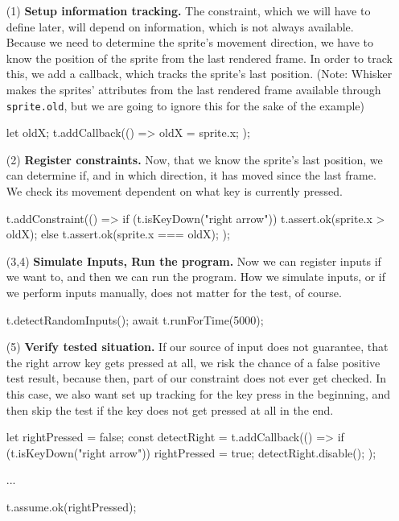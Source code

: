 \begin{enumerate}
    \item[(1)] \textbf{Setup information tracking.}
        The constraint, which we will have to define later, will depend on information, which is not always available.
        Because we need to determine the sprite's movement direction, we have to know the position of the sprite from the last rendered frame.
        In order to track this, we add a callback, which tracks the sprite's last position.
        (Note: Whisker makes the sprites' attributes from the last rendered frame available through \texttt{sprite.old}, but we are going to ignore this for the sake of the example)
        \begin{javascriptcode}
            let oldX;
            t.addCallback(() => {
                oldX = sprite.x;
            });
        \end{javascriptcode}
    \item[(2)] \textbf{Register constraints.}
        Now, that we know the sprite's last position, we can determine if, and in which direction, it has moved since the last frame.
        We check its movement dependent on what key is currently pressed.
        \begin{javascriptcode}
            t.addConstraint(() => {
                if (t.isKeyDown("right arrow")) {
                    t.assert.ok(sprite.x > oldX);
                } else {
                    t.assert.ok(sprite.x === oldX);
                }
            });
        \end{javascriptcode}
    \item[(3,4)] \textbf{Simulate Inputs, Run the program.}
        \setcounter{enumi}{4}
        Now we can register inputs if we want to, and then we can run the program.
        How we simulate inputs, or if we perform inputs manually, does not matter for the test, of course.
        \begin{javascriptcode}
            t.detectRandomInputs();
            await t.runForTime(5000);
        \end{javascriptcode}
    \item[(5)] \textbf{Verify tested situation.}
        If our source of input does not guarantee, that the right arrow key gets pressed at all, we risk the chance of a false positive test result,
        because then, part of our constraint does not ever get checked.
        In this case, we also want set up tracking for the key press in the beginning,
        and then skip the test if the key does not get pressed at all in the end.
        \begin{javascriptcode}
            let rightPressed = false;
            const detectRight = t.addCallback(() => {
                if (t.isKeyDown("right arrow")) {
                    rightPressed = true;
                    detectRight.disable();
                }
            });

            ...

            t.assume.ok(rightPressed);
        \end{javascriptcode}
\end{enumerate}

